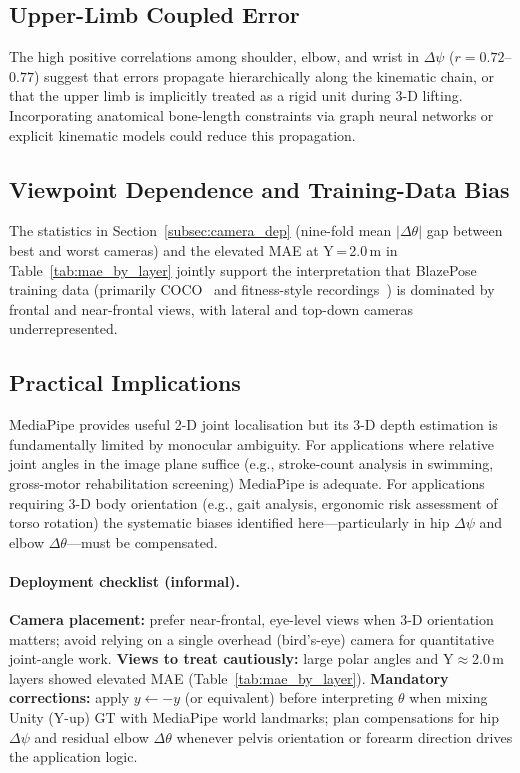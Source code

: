 \documentclass[twocolumn]{article}
\begin{document}
\subsection{Upper-Limb Coupled Error}

The high positive correlations among shoulder, elbow, and wrist in
$\Delta\psi$ ($r=0.72$--$0.77$) suggest that errors propagate
hierarchically along the kinematic chain, or that the upper limb is
implicitly treated as a rigid unit during 3-D lifting. Incorporating
anatomical bone-length constraints via graph neural networks or explicit
kinematic models could reduce this propagation.

\subsection{Viewpoint Dependence and Training-Data Bias}

The statistics in Section~\ref{subsec:camera_dep} (nine-fold mean
$|\Delta\theta|$ gap between best and worst cameras) and the elevated MAE at
Y\,=\,2.0\,m in Table~\ref{tab:mae_by_layer} jointly support the interpretation
that BlazePose training data (primarily COCO~\cite{coco} and fitness-style
recordings~\cite{blazepose}) is dominated by frontal and near-frontal views,
with lateral and top-down cameras underrepresented.

\subsection{Practical Implications}

MediaPipe provides useful 2-D joint localisation but its 3-D depth
estimation is fundamentally limited by monocular ambiguity.
For applications where relative joint angles in the image plane suffice
(e.g., stroke-count analysis in swimming, gross-motor rehabilitation
screening) MediaPipe is adequate. For applications requiring 3-D body
orientation (e.g., gait analysis, ergonomic risk assessment of torso
rotation) the systematic biases identified here---particularly in hip
$\Delta\psi$ and elbow $\Delta\theta$---must be compensated.

\paragraph{Deployment checklist (informal).}
\textbf{Camera placement:} prefer near-frontal, eye-level views when
3-D orientation matters; avoid relying on a single overhead (bird's-eye)
camera for quantitative joint-angle work.
\textbf{Views to treat cautiously:} large polar angles and Y$\approx$2.0\,m
layers showed elevated MAE (Table~\ref{tab:mae_by_layer}).
\textbf{Mandatory corrections:} apply $y \leftarrow -y$ (or equivalent)
before interpreting $\theta$ when mixing Unity (Y-up) GT with MediaPipe
world landmarks; plan compensations for hip $\Delta\psi$ and residual
elbow $\Delta\theta$ whenever pelvis orientation or forearm direction
drives the application logic.
\end{document}
